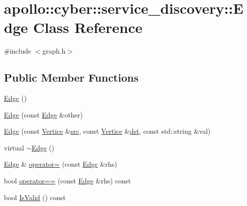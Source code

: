 \hypertarget{classapollo_1_1cyber_1_1service__discovery_1_1Edge}{\section{apollo\-:\-:cyber\-:\-:service\-\_\-discovery\-:\-:Edge Class Reference}
\label{classapollo_1_1cyber_1_1service__discovery_1_1Edge}
}


{\ttfamily \#include $<$graph.\-h$>$}

\subsection*{Public Member Functions}
\begin{DoxyCompactItemize}
\item 
\hyperlink{classapollo_1_1cyber_1_1service__discovery_1_1Edge_ab09bd5871713f14e72d898dc9d276cc8}{Edge} ()
\item 
\hyperlink{classapollo_1_1cyber_1_1service__discovery_1_1Edge_a6c6293df6cbf044adb9765b8def173b7}{Edge} (const \hyperlink{classapollo_1_1cyber_1_1service__discovery_1_1Edge}{Edge} \&other)
\item 
\hyperlink{classapollo_1_1cyber_1_1service__discovery_1_1Edge_a1d5d0fc75b92e628f777364a16fedeec}{Edge} (const \hyperlink{classapollo_1_1cyber_1_1service__discovery_1_1Vertice}{Vertice} \&\hyperlink{classapollo_1_1cyber_1_1service__discovery_1_1Edge_a52a73f7576ac8f0a7a23ac58afe53da5}{src}, const \hyperlink{classapollo_1_1cyber_1_1service__discovery_1_1Vertice}{Vertice} \&\hyperlink{classapollo_1_1cyber_1_1service__discovery_1_1Edge_a79e5638ded81cff42d04c2887dc9e3c2}{dst}, const std\-::string \&val)
\item 
virtual \hyperlink{classapollo_1_1cyber_1_1service__discovery_1_1Edge_aba8a6ab93683ec1160b866f37c2d5897}{$\sim$\-Edge} ()
\item 
\hyperlink{classapollo_1_1cyber_1_1service__discovery_1_1Edge}{Edge} \& \hyperlink{classapollo_1_1cyber_1_1service__discovery_1_1Edge_a0319a9d4ddbe2c65dfd3dc51fe0b09f5}{operator=} (const \hyperlink{classapollo_1_1cyber_1_1service__discovery_1_1Edge}{Edge} \&rhs)
\item 
bool \hyperlink{classapollo_1_1cyber_1_1service__discovery_1_1Edge_a42a2865e39328094afb6bf8feec82dbc}{operator==} (const \hyperlink{classapollo_1_1cyber_1_1service__discovery_1_1Edge}{Edge} \&rhs) const 
\item 
bool \hyperlink{classapollo_1_1cyber_1_1service__discovery_1_1Edge_a8aeefae3093f5b3571308de7d0c19dcb}{Is\-Valid} () const 

\end{DoxyCompactItemize}
